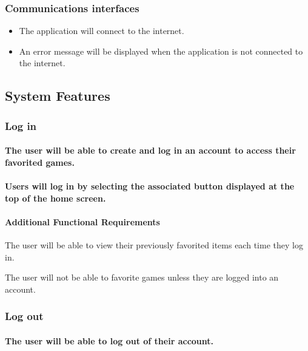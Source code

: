 \documentclass[onecolumn, draftclsnofoot,10pt, compsoc]{IEEEtran}
\begin{document}
\subsubsection{Communications interfaces}
\begin{itemize}
\item The application will connect to the internet.
\item An error message will be displayed when the application is not connected to the internet.
\end{itemize}

\subsection{System Features}

\subsubsection{Log in}
\paragraph{The user will be able to create and log in an account to access their favorited games.}
\paragraph{Users will log in by selecting the associated button displayed at the top of the home screen.}
\begin{itemize}
\paragraph{Additional Functional Requirements}
{\setlength\itemindent{50pt} \item The user will be able to view their previously favorited items each time they log in.}
{\setlength\itemindent{50pt} \item The user will not be able to favorite games unless they are logged into an account.}
\end{itemize}

\subsubsection{Log out}
\paragraph{The user will be able to log out of their account.}
\end{document}
